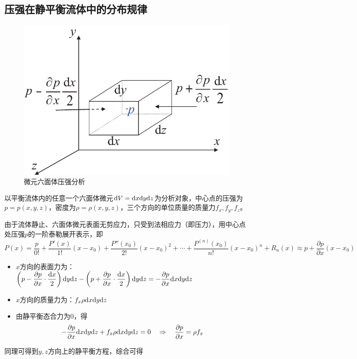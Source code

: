 \subsection{压强在静平衡流体中的分布规律}

\begin{figure}[!htb]
	\centering
	\includegraphics[width=0.35\linewidth]{pic/压强静平衡.pdf}
	\vspace*{-1em}
	\caption{微元六面体压强分析}
	\label{压强静平衡方程推导}
\end{figure}

以平衡流体内的任意一个六面体微元${\rm{d}} V = {\rm{d}} x {\rm{d}} y {\rm{d}} z$为分析对象，中心点的压强为$p = p(x,y,z)$，密度为$\rho = \rho (x,y,z)$，三个方向的单位质量的质量力$f_x, f_y, f_z$。

由于流体静止、六面体微元表面无剪应力，只受到法相应力（即压力），用中心点处压强$p$的一阶泰勒展开表示，即
\begin{equation}
	P(x) = \dfrac{p}{0!} + \dfrac{P'(x)}{1!}(x - x_0) + \dfrac{P''(x_0)}{2!}(x - x_0)^2 + \cdots + \dfrac{P^{(n)}(x_0)}{n!}(x-x_0)^n + R_n(x) \approx p + \dfrac{\partial p}{\partial x} (x - x_0)
\end{equation}

\begin{itemize}
	\item $x$方向的表面力为：$\left(p - \dfrac{\partial p}{\partial x}\cdot \dfrac{{\rm{d}} x}{2}\right){\rm{d}} y {\rm{d}} z  - \left(p + \dfrac{\partial p}{\partial x}\cdot \dfrac{{\rm{d}} x}{2}\right){\rm{d}} y {\rm{d}} z= - \dfrac{\partial p}{\partial x}{\rm{d}} x {\rm{d}} y {\rm{d}} z$
	\item $x$方向的质量力为：$f_x\rho {\rm{d}} x {\rm{d}} y {\rm{d}} z$
	\item 由静平衡态合力为0，得
	\begin{equation}
		- \dfrac{\partial p}{\partial x}{\rm{d}} x {\rm{d}} y {\rm{d}} z + f_x\rho {\rm{d}} x {\rm{d}} y {\rm{d}} z = 0 \quad \Rightarrow \quad \dfrac{\partial p}{\partial x} = \rho f_x
	\end{equation}
\end{itemize}
同理可得到$y,z$方向上的静平衡方程，综合可得


